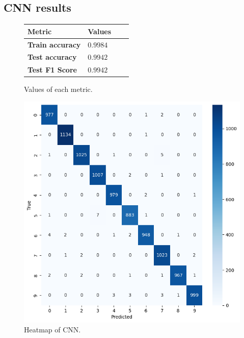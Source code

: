 \subsection{CNN results}

\begin{figure}[H]
    \centering
    \begin{tabular}{|l|l|l|l|}
        \hline
        \rowcolor{gray!50}
        Metric & Values   \\ \hline
        \textbf{Train accuracy} & $0.9984$ \\ \hline
        \textbf{Test accuracy} & $0.9942$ \\ \hline
        \textbf{Test F1 Score} & $0.9942$ \\ \hline
    \end{tabular}
    \caption{Values of each metric.}
\end{figure}

\begin{figure}[H]
    \centering
    \includegraphics[scale=0.55]{src/figs/heatmapCNN.png}
    \caption{Heatmap of CNN.}
    \label{fig:CNNheatmap}
\end{figure}
